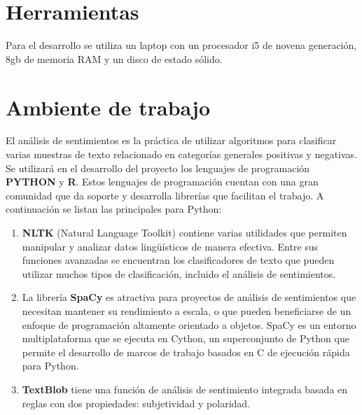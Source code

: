 
\section{Herramientas}

Para el desarrollo se utiliza un laptop con un procesador i5 de novena generación, 8gb de memoria RAM y un disco de estado sólido.

        
\section{Ambiente de trabajo}


El análisis de sentimientos es la práctica de utilizar algoritmos para clasificar varias muestras de texto relacionado en categorías generales positivas y negativas. Se utilizará en el desarrollo del proyecto los lenguajes de programación \textbf{PYTHON} y \textbf{R}. Estos lenguajes de programación cuentan con una gran comunidad que da soporte y desarrolla librerías que facilitan el trabajo. A continuación se listan las principales para Python: 

 \begin{enumerate}
     \item \textbf{NLTK} (Natural Language Toolkit) contiene varias utilidades que permiten manipular y analizar datos lingüísticos de manera efectiva. Entre sus funciones avanzadas se encuentran los clasificadores de texto que pueden utilizar muchos tipos de clasificación, incluido el análisis de sentimientos.
     
     \item La librería \textbf{SpaCy} es atractiva para proyectos de análisis de sentimientos que necesitan mantener su rendimiento a escala, o que pueden beneficiarse de un enfoque de programación altamente orientado a objetos. SpaCy es un entorno multiplataforma que se ejecuta en Cython, un superconjunto de Python que permite el desarrollo de marcos de trabajo basados en C de ejecución rápida para Python.
     
     \item \textbf{TextBlob} tiene una función de análisis de sentimiento integrada basada en reglas con dos propiedades: subjetividad y polaridad. 
\end{enumerate}    

